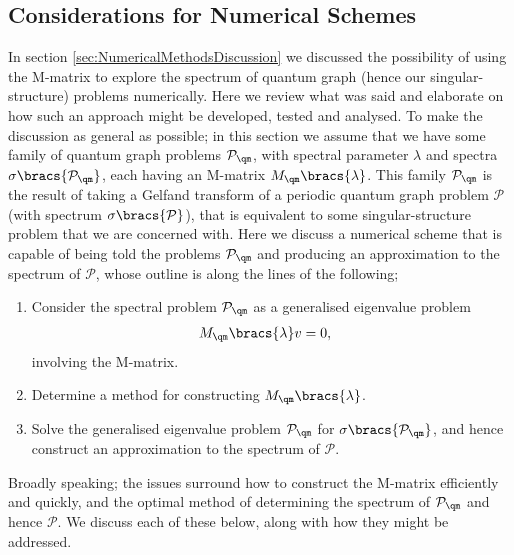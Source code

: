 \subsection{Considerations for Numerical Schemes} \label{sec:ConcFutureNumerical}
In section \ref{sec:NumericalMethodsDiscussion} we discussed the possibility of using the M-matrix to explore the spectrum of quantum graph (hence our singular-structure) problems numerically.
Here we review what was said and elaborate on how such an approach might be developed, tested and analysed.
To make the discussion as general as possible; in this section we assume that we have some family of quantum graph problems $\mathcal{P}_{\qm}$, with spectral parameter $\lambda$ and spectra $\sigma\bracs{\mathcal{P}_{\qm}}$, each having an M-matrix $M_{\qm}\bracs{\lambda}$.
This family $\mathcal{P}_{\qm}$ is the result of taking a Gelfand transform of a periodic quantum graph problem $\mathcal{P}$ (with spectrum $\sigma\bracs{\mathcal{P}}$), that is equivalent to some singular-structure problem that we are concerned with.
Here we discuss a numerical scheme that is capable of being told the problems $\mathcal{P}_{\qm}$ and producing an approximation to the spectrum of $\mathcal{P}$, whose outline is along the lines of the following;
\begin{enumerate}
	\item Consider the spectral problem $\mathcal{P}_{\qm}$ as a generalised eigenvalue problem
	\begin{align*}
		M_{\qm}\bracs{\lambda} v &= 0,
	\end{align*}
	involving the M-matrix.
	\item Determine a method for constructing $M_{\qm}\bracs{\lambda}$.
	\item Solve the generalised eigenvalue problem $\mathcal{P}_{\qm}$ for $\sigma\bracs{\mathcal{P}_{\qm}}$, and hence construct an approximation to the spectrum of $\mathcal{P}$.
\end{enumerate}
Broadly speaking; the issues surround how to construct the M-matrix efficiently and quickly, and the optimal method of determining the spectrum of $\mathcal{P}_{\qm}$ and hence $\mathcal{P}$.
We discuss each of these below, along with how they might be addressed. \newline

